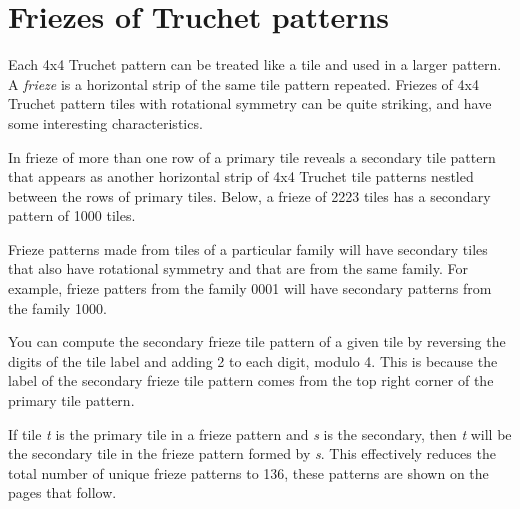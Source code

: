\documentclass{tufte-book}
\begin{document}
\mainmatter


% 
% 
\chapter{Friezes of Truchet patterns}

\noindent
Each 4x4 Truchet pattern can be treated like a tile and used in a larger pattern. A \textit{frieze} is a horizontal strip of the same tile pattern repeated. Friezes of 4x4 Truchet pattern tiles with rotational symmetry can be quite striking, and have some interesting characteristics. 

\vspace{0.5cm}
\noindent
In frieze of more than one row of a primary tile reveals a secondary tile pattern that appears as another horizontal strip of 4x4 Truchet tile patterns nestled between the rows of primary tiles. Below, a frieze of 2223 tiles has a secondary pattern of 1000 tiles.
\,

\vspace{0.5cm}


\vspace{0.5cm}
\noindent
Frieze patterns made from tiles of a particular family will have secondary tiles that also have rotational symmetry and that are from the same family. For example, frieze patters from the family 0001 will have secondary patterns from the family 1000. 
\marginnote{\centering} 

\vspace{0.5cm}
\noindent
You can compute the secondary frieze tile pattern of a given tile by reversing the digits of the tile label and adding 2 to each digit, modulo 4. This is because the label of the secondary frieze tile pattern comes from the top right corner of the primary tile pattern. 

\vspace{0.5cm}
\noindent
If tile \textit{t} is the primary tile in a frieze pattern and \textit{s} is the secondary, then \textit{t} will be the secondary tile in the frieze pattern formed by \textit{s}. This effectively reduces the total number of unique frieze patterns to 136, these patterns are shown on the pages that follow.
\newpage
\end{document}
